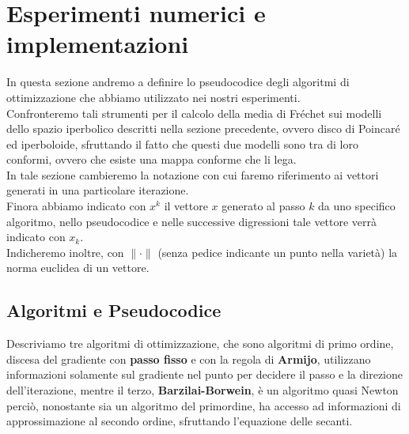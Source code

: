 \documentclass[a4paper, 12pt]{article}
\begin{document}
\section{Esperimenti numerici e implementazioni}
In questa sezione andremo a definire lo pseudocodice degli algoritmi di ottimizzazione che abbiamo utilizzato  nei nostri esperimenti.\\
Confronteremo tali strumenti per il calcolo della media di Fréchet sui modelli dello spazio iperbolico descritti nella sezione precedente, ovvero disco di Poincaré ed iperboloide, sfruttando il fatto che questi due modelli sono tra di loro conformi, ovvero che esiste una mappa conforme che li lega.\\
In tale sezione cambieremo la notazione con cui faremo riferimento ai vettori generati in una particolare iterazione.\\
Finora abbiamo indicato con $x^k$ il vettore $x$ generato al passo $k$ da uno specifico algoritmo, nello pseudocodice e nelle successive digressioni tale vettore verrà indicato con $x_k$.\\
Indicheremo inoltre, con $\| \cdot \|$ (senza pedice indicante un punto nella varietà) la norma euclidea di un vettore.\\
\subsection{Algoritmi e Pseudocodice}
Descriviamo tre algoritmi di ottimizzazione, che sono algoritmi di primo ordine, discesa del gradiente con \textbf{passo fisso} e con la regola di \textbf{Armijo}, utilizzano informazioni solamente sul gradiente nel punto per decidere il passo e la direzione dell'iterazione, mentre il terzo, \textbf{Barzilai-Borwein}, è un algoritmo quasi Newton perciò, nonostante sia un algoritmo del primordine, ha accesso ad informazioni di approssimazione al secondo ordine, sfruttando l'equazione delle secanti.
\end{document}
